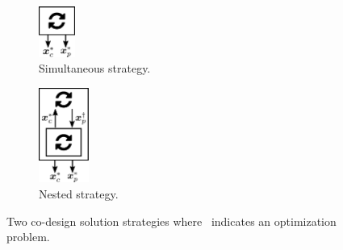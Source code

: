 \begin{figure}[t]
\centering
\begin{subfigure}[b]{0.3\columnwidth}
       \centering
       \includegraphics[width=0.46923076922in]{../ch3/figures/strategies_sim}
       \caption{Simultaneous strategy.\label{fig:ch3:strategies_sim}}
\end{subfigure}%
\begin{subfigure}[b]{0.3\columnwidth}
       \centering
       \includegraphics[width=0.65in]{../ch3/figures/strategies_nested}
       \caption{Nested strategy.\label{fig:ch3:strategies_nested}}
\end{subfigure}%
\caption[Two co-design solution strategies]{Two co-design solution strategies where \faRefresh~indicates an optimization problem.\label{fig:ch3:strategies}}
\end{figure}